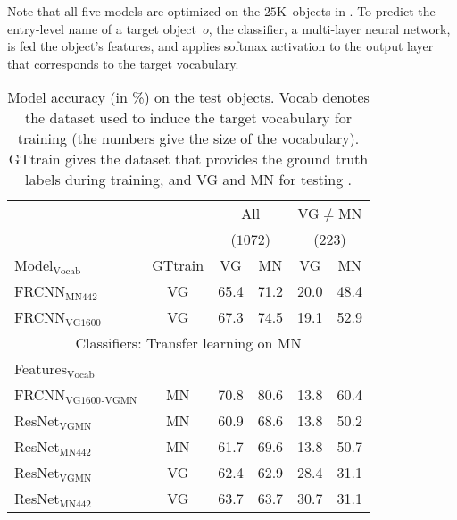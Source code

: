 Note that all five models are optimized on the $25$K~objects in \mn. 
To predict the entry-level name of a target object~$o$, the classifier, a multi-layer neural network, is fed the object's features, and applies softmax activation to the output layer that corresponds to the target vocabulary. 

\begin{table}[t]
	\centering
	\small
	\begin{tabular}{@{~}l@{~}|@{~}c@{~}|cc|cc@{~}}
		\toprule
		&  & \multicolumn{2}{c}{All} 
		& \multicolumn{2}{c}{VG$\neq$MN}\\
		&  & \multicolumn{2}{c}{($1072$)} 
		& \multicolumn{2}{c}{($223$)}\\	
		Model$_{\text{Vocab}}$ 
		&  GTtrain &  VG & MN 
		&  VG & MN \\ 
		\midrule
		FRCNN$_{\text{MN442}}$ & VG &  65.4 &      71.2 &   20.0 &      48.4  \\
		FRCNN$_{\text{VG1600}}$ & VG &    67.3 &      74.5 &    19.1 &      52.9  \\
		\midrule \midrule
		\multicolumn{6}{c}{Classifiers: Transfer learning on MN}\\
		Features$_{\text{Vocab}}$ &   \\
		\midrule 
		FRCNN$_{\text{VG1600}}$$_{\text{-VGMN}}$ & MN &    70.8 &      80.6 &    13.8 &      60.4  \\ 
		\midrule
		ResNet$_{\text{VGMN}}$ & MN  & 60.9 &  68.6 &  13.8 & 50.2  \\
		
		ResNet$_{\text{MN442}}$ & MN &            61.7 &              69.6 &                        13.8 &              50.7 \\
		ResNet$_{\text{VGMN}}$  &   VG &  62.4 &              62.9 &              28.4 &              31.1  \\
		ResNet$_{\text{MN442}}$ & VG  &            63.7 &              63.7 &                  30.7 &              31.1  \\
		\bottomrule
	\end{tabular}
	\caption{Model accuracy (in \%) on the \mn test objects. Vocab denotes the dataset used to induce the target vocabulary for training (the numbers give the size of the vocabulary). GTtrain gives the dataset that provides the ground truth labels during training, and VG and MN for testing \label{tab:exp_VGvsMN}.}
\end{table}


